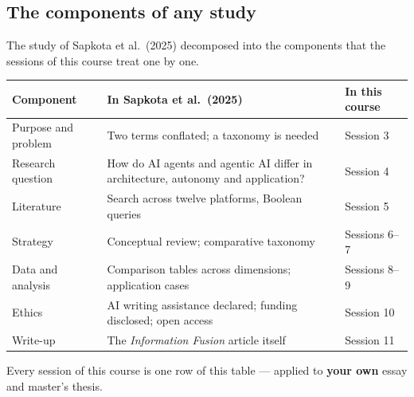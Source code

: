 \documentclass[11pt,a4paper,british,twoside=false,headings=small,chapterprefix=false,numbers=noenddot]{scrbook}
\begin{document}
\subsection{The components of any study}
The study of Sapkota et al.\ (2025) decomposed into the components that the sessions of this course treat one by one.
\begin{center}\small
\small
  \renewcommand{\arraystretch}{1.3}
  \begin{tabular}{@{}p{3.1cm}p{6.6cm}p{3.2cm}@{}}
    \toprule
    \textbf{Component} & \textbf{In Sapkota et al.\ (2025)} & \textbf{In this course}\\
    \midrule
    Purpose and problem & Two terms conflated; a taxonomy is needed & Session 3\\
    Research question   & How do AI agents and agentic AI differ in architecture, autonomy and application? & Session 4\\
    Literature          & Search across twelve platforms, Boolean queries & Session 5\\
    Strategy            & Conceptual review; comparative taxonomy & Sessions 6--7\\
    Data and analysis   & Comparison tables across dimensions; application cases & Sessions 8--9\\
    Ethics              & AI writing assistance declared; funding disclosed; open access & Session 10\\
    Write-up            & The \emph{Information Fusion} article itself & Session 11\\
    \bottomrule
  \end{tabular}
  

  Every session of this course is one row of this table --- applied to
  \textbf{your own} essay and master's thesis.
\end{center}
\end{document}
